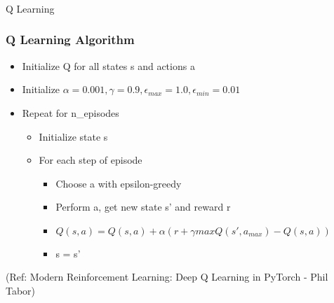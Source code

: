 \begin{frame}[fragile]\frametitle{}
\begin{center}
{\Large Q Learning}
\end{center}
\end{frame}

\begin{frame}[fragile]\frametitle{Q Learning Algorithm}

\begin{itemize}
\item Initialize Q for all states s and actions a 
\item Initialize $\alpha=0.001,\gamma=0.9,\epsilon_{max}=1.0,\epsilon_{min}=0.01$
\item Repeat for n\_episodes
	\begin{itemize}
	\item Initialize state s 
	\item For each step of episode
		\begin{itemize}
		\item Choose a with epsilon-greedy 
		\item Perform a, get new state s’ and reward r 
		\item $Q(s ,a)=Q(s,a)+ \alpha (r + \gamma max Q(s' ,a_{max})- Q(s ,a))$
		\item s = s'
		\end{itemize}
	\end{itemize}
\end{itemize}

{\tiny (Ref: Modern Reinforcement Learning: Deep Q Learning in PyTorch - Phil Tabor)}

\end{frame}